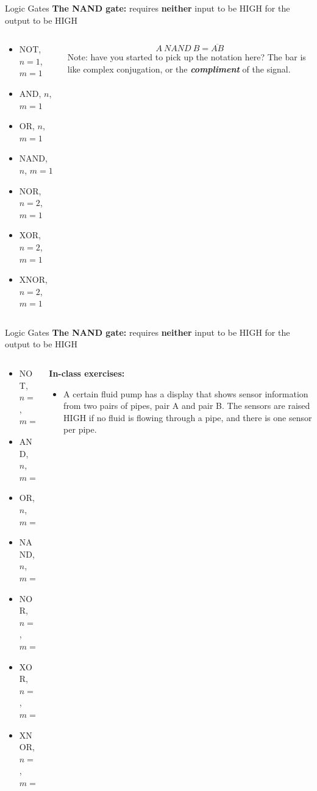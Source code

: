 \documentclass{beamer}
\begin{document}
\begin{frame}{Logic Gates}
\textbf{The NAND gate:} requires \textbf{neither} input to be HIGH for the output to be HIGH \\ \vspace{0.5cm}
\begin{columns}[T]
\begin{column}{0.5\textwidth}
\begin{itemize}
\item \alert{NOT, $n=1$, $m=1$}
\item \alert{AND, $n$, $m=1$}
\item \alert{OR, $n$, $m=1$}
\item \alert{NAND, $n$, $m=1$}
\item NOR, $n=2$, $m=1$
\item XOR, $n=2$, $m=1$
\item XNOR, $n=2$, $m=1$
\end{itemize}
\end{column}
\begin{column}{0.5\textwidth}
\begin{equation}
A ~ NAND ~ B = \overline{AB}
\end{equation}
Note: have you started to pick up the notation here?  The bar is like complex conjugation, or the \textit{\textbf{compliment}} of the signal.
\end{column}
\end{columns}
\end{frame}

\begin{frame}{Logic Gates}
\textbf{The NAND gate:} requires \textbf{neither} input to be HIGH for the output to be HIGH \\ \vspace{0.5cm}
\begin{columns}[T]
\begin{column}{0.5\textwidth}
\begin{itemize}
\item \alert{NOT, $n=1$, $m=1$}
\item \alert{AND, $n$, $m=1$}
\item \alert{OR, $n$, $m=1$}
\item \alert{NAND, $n$, $m=1$}
\item NOR, $n=2$, $m=1$
\item XOR, $n=2$, $m=1$
\item XNOR, $n=2$, $m=1$
\end{itemize}
\end{column}
\begin{column}{0.5\textwidth}
\small
\textbf{In-class exercises:}
\begin{itemize}
\item A certain fluid pump has a display that shows sensor information from two pairs of pipes, pair A and pair B.  The sensors are raised HIGH if no fluid is flowing through a pipe, and there is one sensor per pipe.
\end{itemize}
\end{column}
\end{columns}
\end{frame}
\end{document}
